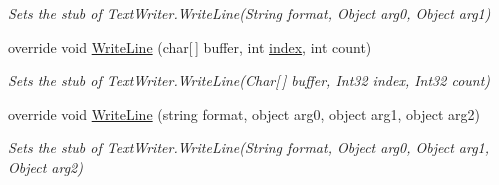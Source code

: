 \begin{DoxyCompactItemize}
\begin{DoxyCompactList}\small\item\em Sets the stub of Text\-Writer.\-Write\-Line(\-String format, Object arg0, Object arg1)\end{DoxyCompactList}\item 
override void \hyperlink{class_system_1_1_i_o_1_1_fakes_1_1_stub_text_writer_a5e7fb97a9be50958c4bc70700313b372}{Write\-Line} (char\mbox{[}$\,$\mbox{]} buffer, int \hyperlink{jquery-1_810_82-vsdoc_8js_a75bb12d1f23302a9eea93a6d89d0193e}{index}, int count)
\begin{DoxyCompactList}\small\item\em Sets the stub of Text\-Writer.\-Write\-Line(\-Char\mbox{[}$\,$\mbox{]} buffer, Int32 index, Int32 count)\end{DoxyCompactList}\item 
override void \hyperlink{class_system_1_1_i_o_1_1_fakes_1_1_stub_text_writer_aed14ab008cff802b6f2c478aab3c56d9}{Write\-Line} (string format, object arg0, object arg1, object arg2)
\begin{DoxyCompactList}\small\item\em Sets the stub of Text\-Writer.\-Write\-Line(\-String format, Object arg0, Object arg1, Object arg2)\end{DoxyCompactList}\end{DoxyCompactItemize}
